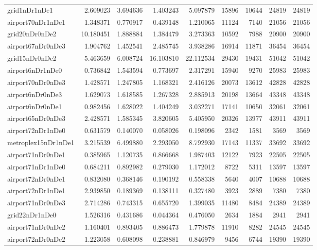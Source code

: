\begin{longtable}{|l|r|r|r|r|r|r|r|r|}
grid1nDr1nDe1 & 2.609023 & 3.694636 & 1.403243 & 5.097879 & 15896 & 10644 & 24819 & 24819 \\
airport70nDr1nDe1 & 1.348371 & 0.770917 & 0.439148 & 1.210065 & 11124 & 7140 & 21056 & 21056 \\
grid20nDr0nDe2 & 10.180451 & 1.888884 & 1.384479 & 3.273363 & 10592 & 7988 & 20900 & 20900 \\
airport67nDr0nDe3 & 1.904762 & 1.452541 & 2.485745 & 3.938286 & 16914 & 11871 & 36454 & 36454 \\
grid15nDr0nDe2 & 5.463659 & 6.008724 & 16.103810 & 22.112534 & 29430 & 19431 & 51042 & 51042 \\
airport6nDr1nDe0 & 0.736842 & 1.543594 & 0.773697 & 2.317291 & 15940 & 9270 & 25983 & 25983 \\
airport70nDr0nDe3 & 1.428571 & 1.247805 & 1.168321 & 2.416126 & 20073 & 13612 & 42828 & 42828 \\
airport6nDr0nDe3 & 1.629073 & 1.618585 & 1.267328 & 2.885913 & 20198 & 13664 & 43348 & 43348 \\
airport6nDr0nDe1 & 0.982456 & 1.628022 & 1.404249 & 3.032271 & 17141 & 10650 & 32061 & 32061 \\
airport65nDr0nDe3 & 2.428571 & 1.585345 & 3.820605 & 5.405950 & 20326 & 13977 & 43911 & 43911 \\
airport72nDr1nDe0 & 0.631579 & 0.140070 & 0.058026 & 0.198096 & 2342 & 1581 & 3569 & 3569 \\
metroplex15nDr1nDe1 & 3.215539 & 6.499880 & 2.293050 & 8.792930 & 17143 & 11337 & 33692 & 33692 \\
airport71nDr0nDe1 & 0.385965 & 1.120735 & 0.866668 & 1.987403 & 12122 & 7923 & 22505 & 22505 \\
airport71nDr1nDe0 & 0.684211 & 0.892982 & 0.279030 & 1.172012 & 8722 & 5311 & 13597 & 13597 \\
airport72nDr0nDe1 & 0.832080 & 0.368146 & 0.190192 & 0.558338 & 5640 & 4007 & 10688 & 10688 \\
airport72nDr1nDe1 & 2.939850 & 0.189369 & 0.138111 & 0.327480 & 3923 & 2889 & 7380 & 7380 \\
airport71nDr0nDe3 & 2.714286 & 0.743315 & 0.655720 & 1.399035 & 11480 & 8484 & 24389 & 24389 \\
grid22nDr1nDe0 & 1.526316 & 0.431686 & 0.044364 & 0.476050 & 2634 & 1884 & 2941 & 2941 \\
airport71nDr0nDe2 & 1.160401 & 0.893405 & 0.886473 & 1.779878 & 11910 & 8282 & 24545 & 24545 \\
airport72nDr0nDe2 & 1.223058 & 0.608098 & 0.238881 & 0.846979 & 9456 & 6744 & 19390 & 19390 \\

\end{longtable}
